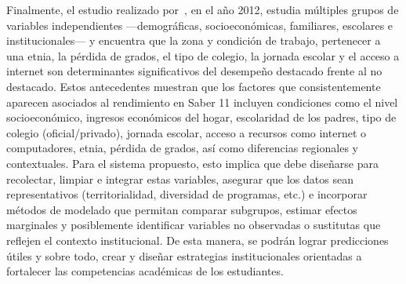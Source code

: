 Finalmente, el estudio realizado por~\cite{garcia2012factores}, en el año 2012, estudia múltiples grupos de variables independientes ---demográficas, socioeconómicas, familiares, escolares e institucionales--- y encuentra que la zona y condición de trabajo, pertenecer a una etnia, la pérdida de grados, el tipo de colegio, la jornada escolar y el acceso a internet son determinantes significativos del desempeño destacado frente al no destacado.
Estos antecedentes muestran que los factores que consistentemente aparecen asociados al rendimiento en Saber 11 incluyen condiciones como el nivel socioeconómico, ingresos económicos del hogar, escolaridad de los padres, tipo de colegio (oficial/privado), jornada escolar, acceso a recursos como internet o computadores, etnia, pérdida de grados, así como diferencias regionales y contextuales.
Para el sistema propuesto, esto implica que debe diseñarse para recolectar, limpiar e integrar estas variables, asegurar que los datos sean representativos (territorialidad, diversidad de programas, etc.) e incorporar métodos de modelado que permitan comparar subgrupos, estimar efectos marginales y posiblemente identificar variables no observadas o sustitutas	 que reflejen el contexto institucional. De esta manera, se podrán lograr predicciones útiles y sobre todo, crear y diseñar estrategias institucionales orientadas a fortalecer las competencias académicas de los estudiantes.